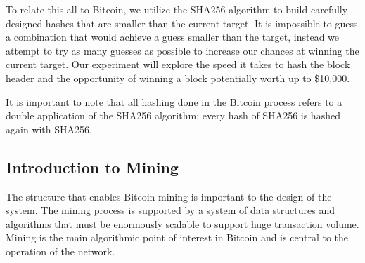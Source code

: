 \documentclass[pdftex,11pt]{article}
\begin{document}
To relate this all to Bitcoin, we utilize the SHA256 algorithm to build carefully designed hashes that are smaller than the current target. It is impossible to guess a combination that would achieve a guess smaller than the target, instead we attempt to try as many guesses as possible to increase our chances at winning the current target. Our experiment will explore the speed it takes to hash the block header and the opportunity of winning a block potentially worth up to \$10,000.

It is important to note that all hashing done in the Bitcoin process refers to a double application of the SHA256 algorithm; every hash of SHA256 is hashed again with SHA256.

\subsection{Introduction to Mining}
The structure that enables Bitcoin mining is important to the design of the system. The mining process is supported by a system of data structures and algorithms that must be enormously scalable to support huge transaction volume. Mining is the main algorithmic point of interest in Bitcoin and is central to the operation of the network.
\end{document}
